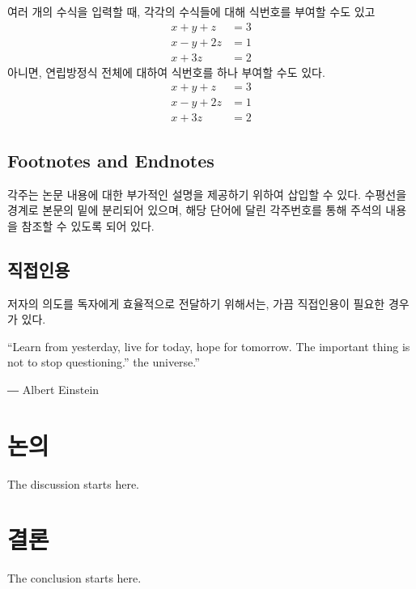 \documentclass[11pt]{report}
\numberwithin{figure}{section}
\theoremstyle{plain}
\theoremstyle{definition}
\theoremstyle{corollary}
\theoremstyle{definition}
\theoremstyle{plain}
\theoremstyle{definition}
\theoremstyle{plain}
\begin{document}
여러 개의 수식을 입력할 때, 각각의 수식들에 대해 식번호를 부여할 수도 있고
\begin{align}
x+y+z&=3\\
x-y+2z&=1\\
x+3z&=2
\end{align}
아니면, 연립방정식 전체에 대하여 식번호를 하나 부여할 수도 있다.
\begin{equation}
\begin{aligned}
x+y+z&=3\\
x-y+2z&=1\\
x+3z&=2
\end{aligned}
\end{equation}

\section{Footnotes and Endnotes}\label{sec:footnotes_endnotes}

각주는 논문 내용에 대한 부가적인 설명을 제공하기 위하여 삽입할 수 있다.
수평선을 경계로 본문의 밑에 분리되어 있으며, 해당 단어에 달린 각주번호를 통해 주석의 내용을 참조할 수 있도록 되어 있다.

\section{직접인용}\label{sec:quotation}
저자의 의도를 독자에게 효율적으로 전달하기 위해서는, 가끔 직접인용이 필요한 경우가 있다.\par
\bigskip

\leftskip 1.5cm
\rightskip 1.5cm 

“Learn from yesterday, live for today, hope for tomorrow. The important thing is not to stop questioning.” the universe.” \par
― Albert Einstein 

\leftskip 0cm
\rightskip 0cm 

\chapter{논의}\label{chap:discussion}
The discussion starts here.

\chapter{결론}\label{chap:conclusion}
The conclusion starts here. \par
\end{document}
